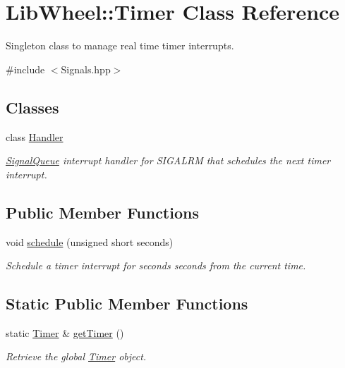 \hypertarget{classLibWheel_1_1Timer}{
\section{\-Lib\-Wheel\-:\-:\-Timer \-Class \-Reference}
\label{classLibWheel_1_1Timer}
}


\-Singleton class to manage real time timer interrupts.  




{\ttfamily \#include $<$\-Signals.\-hpp$>$}

\subsection*{\-Classes}
\begin{DoxyCompactItemize}
\item 
class \hyperlink{classLibWheel_1_1Timer_1_1Handler}{\-Handler}
\begin{DoxyCompactList}\small\item\em \hyperlink{classLibWheel_1_1SignalQueue}{\-Signal\-Queue} interrupt handler for \-S\-I\-G\-A\-L\-R\-M that schedules the next timer interrupt. \end{DoxyCompactList}\end{DoxyCompactItemize}
\subsection*{\-Public \-Member \-Functions}
\begin{DoxyCompactItemize}
\item 
void \hyperlink{classLibWheel_1_1Timer_a65bd67b98a78429de6d3902d1c76e226}{schedule} (unsigned short seconds)
\begin{DoxyCompactList}\small\item\em \-Schedule a timer interrupt for {\itshape seconds\/} seconds from the current time. \end{DoxyCompactList}\end{DoxyCompactItemize}
\subsection*{\-Static \-Public \-Member \-Functions}
\begin{DoxyCompactItemize}
\item 
static \hyperlink{classLibWheel_1_1Timer}{\-Timer} \& \hyperlink{classLibWheel_1_1Timer_a746fd7400e3882443c54a2d7360f6de5}{get\-Timer} ()
\begin{DoxyCompactList}\small\item\em \-Retrieve the global \hyperlink{classLibWheel_1_1Timer}{\-Timer} object. \end{DoxyCompactList}\end{DoxyCompactItemize}
